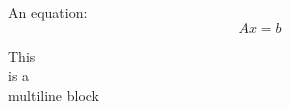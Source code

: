 \documentclass[11pt]{article}
\begin{document}
An equation:
\[
Ax = b
\]
\begin{obeylines}
This
is a
multiline block
\end{obeylines}
\end{document}
